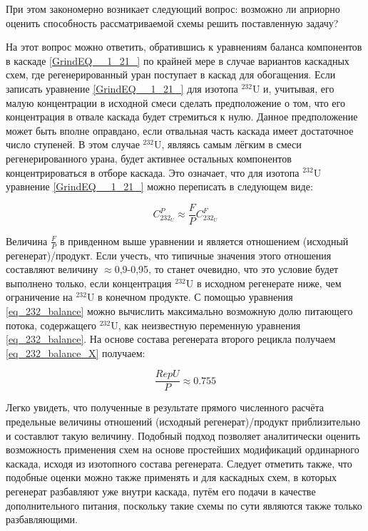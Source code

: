 При этом закономерно возникает следующий вопрос: возможно ли априорно оценить способность рассматриваемой схемы решить поставленную задачу? 

На этот вопрос можно ответить, обратившись к уравнениям баланса компонентов в каскаде \ref{GrindEQ__1_21_} по крайней мере в случае вариантов каскадных схем, где регенерированный уран поступает в каскад для обогащения. Если записать уравнение \ref{GrindEQ__1_21_} для изотопа $^{232}$U и, учитывая, его малую концентрации в исходной смеси сделать предположение о том, что его концентрация в отвале каскада будет стремиться к нулю. Данное предположение может быть вполне оправдано, если отвальная часть каскада имеет достаточное число ступеней. В этом случае $^{232}$U, являясь самым лёгким в смеси регенерированного урана, будет активнее остальных компонентов концентрироваться в отборе каскада. Это означает, что для изотопа $^{232}$U уравнение \ref{GrindEQ__1_21_} можно переписать в следующем виде:

\begin{equation}
\label{eq_232_balance}
  C_{232_{U}}^{P} \approx \frac{F}{P} C_{232_{U}}^{F}
\end{equation}

Величина $\frac{F}{P}$ в привденном выше уравнении и является отношением (исходный регенерат)/продукт. Если учесть, что типичные значения этого отношения составляют величину $\approx$0,9-0,95, то станет очевидно, что это условие будет выполнено только, если концентрация $^{232}$U в исходном регенерате ниже, чем ограничение на $^{232}$U в конечном продукте. 
С помощью уравнения \ref{eq_232_balance} можно вычислить максимально возможную долю питающего потока, содержащего $^{232}$U, как неизвестную переменную уравнения \ref{eq_232_balance}. На основе состава регенерата второго рецикла получаем \ref{eq_232_balance_X} получаем:


\begin{equation}
  \label{eq_232_balance_X}
    \frac{RepU}{P} \approx 0.755
\end{equation}

Легко увидеть, что полученные в результате прямого численного расчёта предельные величины отношений (исходный регенерат)/продукт приблизительно и составлют такую величину.
Подобный подход позволяет аналитически оценить возможность применения схем на основе простейших модификаций ординарного каскада, исходя из изотопного состава регенерата. Следует отметить также, что подобные оценки можно также применять и для каскадных схем, в которых регенерат разбавляют уже внутри каскада, путём его подачи в качестве дополнительного питания, поскольку такие схемы по сути являются также только разбавляющими.

